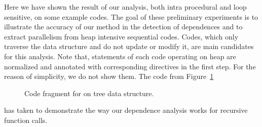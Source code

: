 Here we have shown the result of our analysis, both intra procedural 
and loop sensitive, on some example codes. The goal of these preliminary 
experiments is to illustrate the accuracy of our method in the detection of 
dependences and to extract parallelism from heap intensive sequential codes. 
Codes, which only traverse the data structure and do not update or modify it, 
are main candidates for this analysis. Note that, statements of each code 
operating on heap are normalized and annotated with corresponding directives in the first step. 
For the reason of simplicity, we do not show them. The code from Figure~\ref{fig:treeadd} 
\begin{figure}%
  \begin{center}
  \end{center}
  \caption{\label{fig:treeadd} Code fragment for  on tree data structure.}
\end{figure}
has taken to demonstrate the way our dependence analysis works for recursive function calls. 
